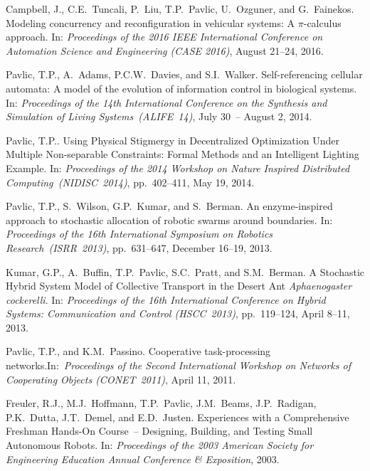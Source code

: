 \documentclass[10pt]{article}           %
\begin{document}
\begin{bibenum}
    \item Campbell, J., C.E.~Tuncali, P.~Liu, T.P.~Pavlic, U.~Ozguner,
        and G.~Fainekos. Modeling concurrency and reconfiguration in
        vehicular systems: A $\pi$-calculus approach. In:
        \emph{Proceedings of the 2016 IEEE International Conference on
        Automation Science and Engineering (CASE 2016)}, August 21--24,
        2016.\\

    \item Pavlic, T.P., A.~Adams, P.C.W.~Davies, and S.I.~Walker.
        Self-referencing cellular automata: A model of the evolution of
        information control in biological systems.
        In: \emph{Proceedings of the 14th International Conference on
        the Synthesis and Simulation of Living Systems~(ALIFE~14)},
        July 30~-- August 2, 2014.\\

    \item Pavlic, T.P.. Using Physical Stigmergy in Decentralized
        Optimization Under Multiple Non-separable Constraints: Formal
        Methods and an Intelligent Lighting Example. In:
        \emph{Proceedings of the 2014 Workshop on Nature Inspired
        Distributed Computing~(NIDISC~2014)}, pp.~402--411, May 19, 2014.

    \item Pavlic, T.P., S.~Wilson, G.P.~Kumar, and S.~Berman.
        An enzyme-inspired approach to stochastic allocation of robotic
        swarms around boundaries. In: \emph{Proceedings of the 16th
        International Symposium on Robotics Research~(ISRR~2013)},
        pp.~631--647, December 16--19, 2013.

    \item Kumar, G.P., A.~Buffin, T.P.~Pavlic, S.C.~Pratt, and
        S.M.~Berman. A Stochastic Hybrid System Model of Collective
        Transport in the Desert Ant \emph{Aphaenogaster cockerelli}. In:
        \emph{Proceedings of the 16th International Conference on Hybrid
        Systems: Communication and Control (HSCC~2013)}, pp.~119--124,
        April 8--11, 2013. 

    \item Pavlic, T.P., and K.M.~Passino. Cooperative task-processing
        networks.\linebreak[4] In:~\emph{Proceedings of the Second
        International Workshop on Networks of Cooperating
        Objects (CONET~2011)}, April 11, 2011.

    \item Freuler, R.J., M.J.~Hoffmann, T.P.~Pavlic, J.M.~Beams,
        J.P.~Radigan, P.K.~Dutta, J.T.~Demel, and E.D.~Justen.
        Experiences with a Comprehensive Freshman Hands-On Course~--
        Designing, Building, and Testing Small Autonomous Robots. In:
        \emph{Proceedings of the 2003 American Society for Engineering
        Education Annual Conference \& Exposition}, 2003.

\end{bibenum}
\end{document}
